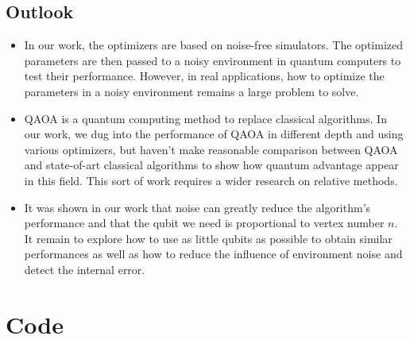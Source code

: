 \documentclass{./source/Report}
\begin{document}
\subsection{Outlook}

\begin{itemize}
    \item In our work, the optimizers are based on noise-free simulators. The optimized parameters are then passed to a noisy environment in quantum computers to test their performance. However, in real applications, how to optimize the parameters in a noisy environment remains a large problem to solve.
    \item QAOA is a quantum computing method to replace classical algorithms. In our work, 
we dug into the performance of QAOA in different depth and using various optimizers, 
but haven't make reasonable comparison between QAOA and state-of-art classical algorithms to show 
how quantum advantage appear in this field. This sort of work requires a wider research on 
relative methods. 
    \item It was shown in our work that noise can greatly reduce the algorithm's 
performance and that the qubit we need is proportional to vertex number $n$. It remain to explore how 
to use as little qubits as possible to obtain similar performances as well 
as how to reduce the influence of environment noise and detect the internal error.
\end{itemize}


\appendix

\section{Code}






\nocite{*}


\end{document}
